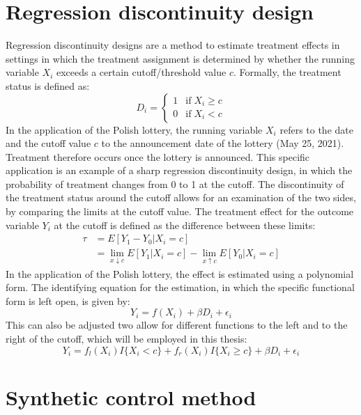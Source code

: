 \documentclass{scrbook}
\begin{document}
\section{Regression discontinuity design}

Regression discontinuity designs are a method to estimate treatment
effects in settings in which the treatment assignment is determined by
whether the running variable \(X_{i}\) exceeds a certain
cutoff/threshold value \(c\). Formally, the treatment status is defined
as: \begin{equation}
D_{i} = \begin{cases}
1 & \text{if}\; X_{i} \geq c \\
0 & \text{if}\; X_{i} < c
\end{cases}
\end{equation} In the application of the Polish lottery, the running
variable \(X_{i}\) refers to the date and the cutoff value \(c\) to the
announcement date of the lottery (May 25, 2021). Treatment therefore
occurs once the lottery is announced. This specific application is an
example of a sharp regression discontinuity design, in which the
probability of treatment changes from 0 to 1 at the cutoff. The
discontinuity of the treatment status around the cutoff allows for an
examination of the two sides, by comparing the limits at the cutoff
value. The treatment effect for the outcome variable \(Y_{i}\) at the
cutoff is defined as the difference between these limits:
\begin{align}    
\tau & =E[Y_{1}-Y_{0}\vert X_{i}=c] \\
     & =\lim_{x\downarrow c} E[Y_{1}\vert X_{i}=c]-\lim_{x\uparrow c} E[Y_{0}\vert X_{i}=c] \nonumber
\end{align} \noindent In the application of the Polish lottery, the
effect is estimated using a polynomial form. The identifying equation
for the estimation, in which the specific functional form is left open,
is given by: \begin{equation}
Y_{i}=f(X_{i})+\beta D_{i}+\epsilon_{i}
\end{equation} This can also be adjusted two allow for different
functions to the left and to the right of the cutoff, which will be
employed in this thesis: \begin{equation}
Y_{i}=f_{l}(X_{i})I\{X_{i}<c\}+f_{r}(X_{i})I\{X_{i}\geq c\}+\beta D_{i}+\epsilon_{i}
\end{equation}

\section{Synthetic control method}
\end{document}
